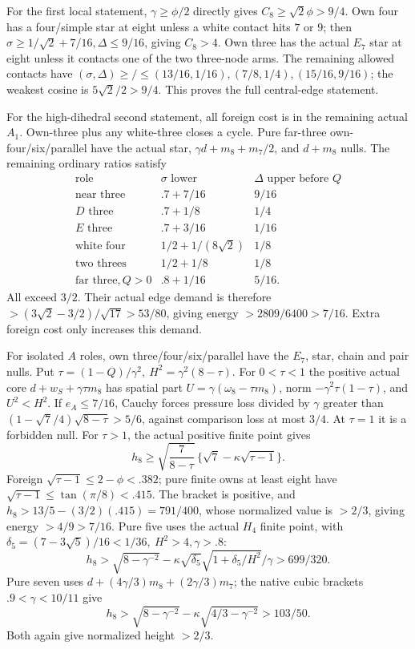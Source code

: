 \documentclass[11pt]{article}
\theoremstyle{definition}
\theoremstyle{remark}
\begin{document}
For the first local statement, \(\gamma\geq\phi/2\) directly
gives \(C_8\geq\sqrt2\phi>9/4\).
Own four has a four/simple star at eight unless a white contact
hits \(7\) or \(9\); then
\(\sigma\geq1/\sqrt2+7/16,\Delta\leq9/16\), giving \(C_8>4\).
Own three has the actual \(E_7\) star at eight unless it contacts
one of the two three-node arms.
The remaining allowed contacts have
\((\sigma,\Delta)\geq/\leq
(13/16,1/16),(7/8,1/4),(15/16,9/16)\);
the weakest cosine is \(5\sqrt2/2>9/4\).
This proves the full central-edge statement.

For the high-dihedral second statement, all foreign cost is in
the remaining actual \(A_1\).
Own-three plus any white-three closes a cycle.
Pure far-three own-four/six/parallel have the actual star,
\(\gamma d+m_8+m_7/2\), and \(d+m_8\) nulls.
The remaining ordinary ratios satisfy
\[
\begin{array}{c|c|c}
\text{role}&\sigma\text{ lower}&\Delta\text{ upper before }Q\\ \hline
\text{near three}&.7+7/16&9/16\\
D\text{ three}&.7+1/8&1/4\\
E\text{ three}&.7+3/16&1/16\\
\text{white four}&1/2+1/(8\sqrt2)&1/8\\
\text{two threes}&1/2+1/8&1/8\\
\text{far three},Q>0&.8+1/16&5/16 .
\end{array}
\]
All exceed \(3/2\). Their actual edge demand is therefore
\(>(3\sqrt2-3/2)/\sqrt{17}>53/80\), giving energy
\(>2809/6400>7/16\).
Extra foreign cost only increases this demand.

For isolated \(A\) roles, own three/four/six/parallel have the
\(E_7\), star, chain and pair nulls.
Put \(\tau=(1-Q)/\gamma^2,\ H^2=\gamma^2(8-\tau)\).
For \(0<\tau<1\) the positive actual core
\(d+w_S+\gamma\tau m_8\) has spatial part
\(U=\gamma(\omega_8-\tau m_8)\), norm
\(-\gamma^2\tau(1-\tau)\), and \(U^2<H^2\).
If \(e_A\leq7/16\), Cauchy forces pressure loss divided by
\(\gamma\) greater than
\((1-\sqrt7/4)\sqrt{8-\tau}>5/6\),
against comparison loss at most \(3/4\).
At \(\tau=1\) it is a forbidden null.
For \(\tau>1\), the actual positive finite point gives
\[
 h_8\geq\sqrt{\frac7{8-\tau}}\,
              \{\sqrt7-\kappa\sqrt{\tau-1}\}.
\]
Foreign \(\sqrt{\tau-1}\leq2-\phi<.382\);
pure finite owns at least eight have
\(\sqrt{\tau-1}\leq\tan(\pi/8)<.415\).
The bracket is positive, and
\(h_8>13/5-(3/2)(.415)=791/400\), whose normalized value
is \(>2/3\), giving energy \(>4/9>7/16\).
Pure five uses the actual \(H_4\) finite point, with
\(\delta_5=(7-3\sqrt5)/16<1/36,\ H^2>4,\gamma>.8\):
\[
 h_8>\sqrt{8-\gamma^{-2}}
 -\kappa\sqrt{\delta_5}\sqrt{1+\delta_5/H^2}/\gamma
 >699/320 .
\]
Pure seven uses \(d+(4\gamma/3)m_8+(2\gamma/3)m_7\);
the native cubic brackets \(.9<\gamma<10/11\) give
\[
 h_8>\sqrt{8-\gamma^{-2}}
 -\kappa\sqrt{4/3-\gamma^{-2}}>103/50 .
\]
Both again give normalized height \(>2/3\).
\end{document}
